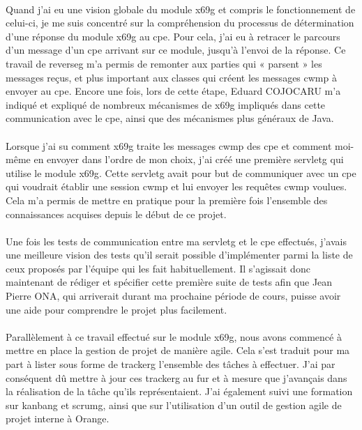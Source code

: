 \documentclass[12pt,a4paper]{report}
\begin{document}
\paragraph*{} Quand j’ai eu une vision globale du module \gls{x69g} et compris le
fonctionnement de celui-ci, je me suis concentré sur la compréhension du processus de
détermination d’une réponse du module \gls{x69g} au \gls{cpe}. Pour cela, j’ai eu à retracer le parcours d’un message d’un \gls{cpe} arrivant sur ce module, jusqu’à l’envoi de la réponse. Ce travail de \gls{reverseg} m’a permis de remonter aux parties qui « parsent » les messages reçus, et plus important aux classes qui créent les messages \gls{cwmp} à envoyer au \gls{cpe}. Encore une fois, lors de cette étape, Eduard COJOCARU m’a indiqué et expliqué de nombreux mécanismes de \gls{x69g} impliqués dans cette communication avec le \gls{cpe}, ainsi que des mécanismes plus généraux de Java.
\paragraph*{}Lorsque j’ai su comment \gls{x69g} traite les messages \gls{cwmp} des \gls{cpe} et comment moi-même en envoyer dans l’ordre de mon choix, j’ai créé une première \gls{servletg} qui utilise le module \gls{x69g}. Cette \gls{servletg} avait pour but de communiquer avec un \gls{cpe} qui voudrait établir une session \gls{cwmp} et lui envoyer les requêtes \gls{cwmp} voulues. Cela m’a permis de mettre en pratique pour la première fois l’ensemble des connaissances acquises depuis le début de ce projet.
\paragraph*{}Une fois les tests de communication entre ma \gls{servletg} et le \gls{cpe} effectués, j’avais une meilleure vision des tests qu’il serait possible d’implémenter parmi la liste de ceux proposés par l’équipe qui les fait habituellement. Il s’agissait donc maintenant de rédiger et spécifier cette première suite de tests afin que Jean Pierre ONA, qui arriverait durant ma prochaine période de cours, puisse avoir une aide pour comprendre le projet plus facilement.
\paragraph*{}Parallèlement à ce travail effectué sur le module \gls{x69g}, nous avons
commencé à mettre en place la gestion de projet de manière agile. Cela s’est traduit pour ma part à lister sous forme de \gls{trackerg} l’ensemble des tâches à effectuer. J’ai par conséquent dû mettre à jour ces \gls{trackerg} au fur et à mesure que j’avançais dans la réalisation de la tâche qu’ils représentaient. J’ai également suivi une formation sur \gls{kanbang} et \gls{scrumg}, ainsi que sur l’utilisation d’un outil de gestion agile de projet interne à Orange. \\
\end{document}
